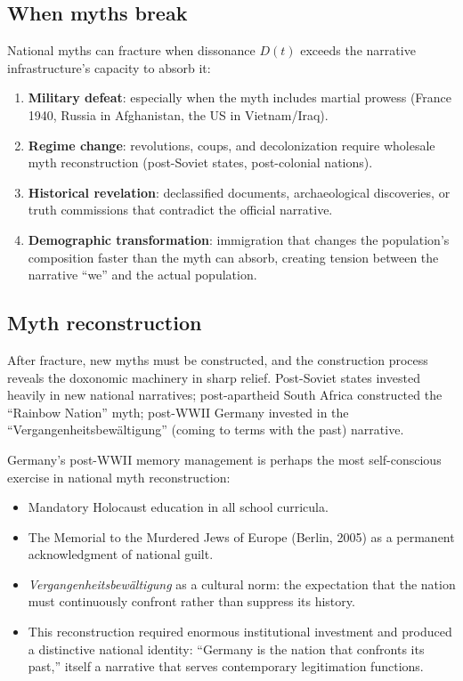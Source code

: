 \subsection{When myths break}

National myths can fracture when dissonance $D(t)$ exceeds the narrative infrastructure's capacity to absorb it:

\begin{enumerate}[nosep]
  \item \textbf{Military defeat}: especially when the myth includes martial prowess (France 1940, Russia in Afghanistan, the US in Vietnam/Iraq).
  \item \textbf{Regime change}: revolutions, coups, and decolonization require wholesale myth reconstruction (post-Soviet states, post-colonial nations).
  \item \textbf{Historical revelation}: declassified documents, archaeological discoveries, or truth commissions that contradict the official narrative.
  \item \textbf{Demographic transformation}: immigration that changes the population's composition faster than the myth can absorb, creating tension between the narrative ``we'' and the actual population.
\end{enumerate}

\subsection{Myth reconstruction}

After fracture, new myths must be constructed, and the construction process reveals the doxonomic machinery in sharp relief.
Post-Soviet states invested heavily in new national narratives; post-apartheid South Africa constructed the ``Rainbow Nation'' myth; post-WWII Germany invested in the ``Vergangenheitsbew\"{a}ltigung'' (coming to terms with the past) narrative.

\begin{example}
\label{ex:german-memory}
Germany's post-WWII memory management is perhaps the most self-conscious exercise in national myth reconstruction:
\begin{itemize}[nosep]
  \item Mandatory Holocaust education in all school curricula.
  \item The Memorial to the Murdered Jews of Europe (Berlin, 2005) as a permanent acknowledgment of national guilt.
  \item \emph{Vergangenheitsbew\"{a}ltigung} as a cultural norm: the expectation that the nation must continuously confront rather than suppress its history.
  \item This reconstruction required enormous institutional investment and produced a distinctive national identity: ``Germany is the nation that confronts its past,'' itself a narrative that serves contemporary legitimation functions.
\end{itemize}
\end{example}

